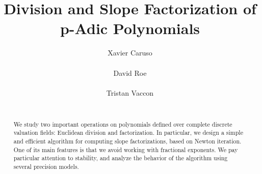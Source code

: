 \documentclass{sig-alternate-2013}
\newcommand{\RS}{\text{\rm RS}}
\begin{document}
\newtheorem{theo}{Theorem}[section]
\newtheorem{lem}[theo]{Lemma}
\newtheorem{prop}[theo]{Proposition}
\newtheorem{cor}[theo]{Corollary}
\newtheorem{quest}[theo]{Question}
\newtheorem{conj}[theo]{Conjecture}
\theoremstyle{definition}
\newtheorem{rem}[theo]{Remark}
\newtheorem{ex}[theo]{Example}
\newtheorem{deftn}[theo]{Definition}

\title{Division and Slope Factorization of p-Adic Polynomials}

\author{
\alignauthor Xavier Caruso\\
  \\
\alignauthor David Roe \\
  \\
\alignauthor Tristan Vaccon\\
  \\
}

\maketitle

\begin{abstract}
We study two important operations on polynomials defined over complete 
discrete valuation fields: Euclidean division and factorization. In particular,
we design a simple and efficient algorithm for computing slope factorizations,
based on Newton iteration.  One of its main features is that we avoid working
with fractional exponents.
We pay particular attention to stability, and analyze the behavior
of the algorithm using several precision models.
\end{abstract}

\keywords{}

%
%
\end{document}
